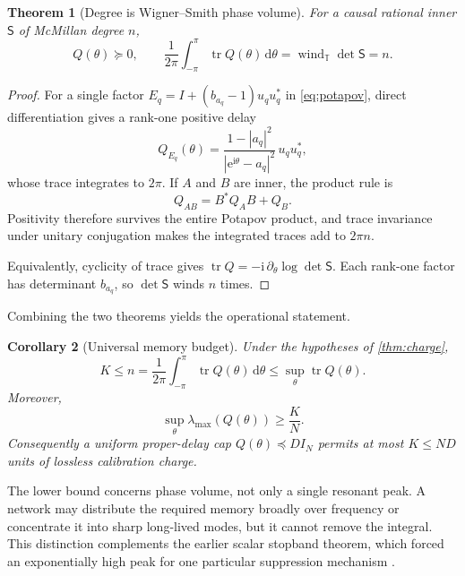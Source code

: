 \documentclass[11pt]{article}
\newtheorem{theorem}{Theorem}[section]
\newtheorem{corollary}[theorem]{Corollary}
\theoremstyle{definition}
\theoremstyle{remark}
\newcommand{\T}{\mathbb{T}}
\newcommand{\tr}{\operatorname{tr}}
\newcommand{\dd}{\mathrm{d}}
\newcommand{\e}{\mathrm{e}}
\begin{document}
\begin{theorem}[Degree is Wigner--Smith phase volume]
\label{thm:sumrule}
For a causal rational inner $\mathsf S$ of McMillan degree $n$,
\begin{equation}\label{eq:sumrule}
 Q(\theta)\succeq0,
 \qquad
 \frac1{2\pi}\int_{-\pi}^{\pi}\tr Q(\theta)\,\dd\theta
 =\operatorname{wind}_{\T}\det\mathsf S=n.
\end{equation}
\end{theorem}

\begin{proof}
For a single factor
$E_q=I+(b_{a_q}-1)u_qu_q^*$ in \eqref{eq:potapov}, direct differentiation
gives a rank-one positive delay
\begin{equation}\label{eq:poisson}
 Q_{E_q}(\theta)=
 \frac{1-|a_q|^2}{|\e^{\mathrm{i}\theta}-a_q|^2}\,u_qu_q^*,
\end{equation}
whose trace integrates to $2\pi$.  If $A$ and $B$ are inner, the product rule
is
\[
 Q_{AB}=B^*Q_AB+Q_B.
\]
Positivity therefore survives the entire Potapov product, and trace
invariance under unitary conjugation makes the integrated traces add to
$2\pi n$.

Equivalently, cyclicity of trace gives
$\tr Q=-\mathrm{i}\,\partial_\theta\log\det\mathsf S$.  Each rank-one
factor has determinant $b_{a_q}$, so $\det\mathsf S$ winds $n$ times.
\end{proof}

Combining the two theorems yields the operational statement.

\begin{corollary}[Universal memory budget]
\label{cor:memory}
Under the hypotheses of \cref{thm:charge},
\begin{equation}\label{eq:memorybudget}
 K\leq n
 =\frac1{2\pi}\int_{-\pi}^{\pi}\tr Q(\theta)\,\dd\theta
 \leq \sup_\theta\tr Q(\theta).
\end{equation}
Moreover,
\begin{equation}\label{eq:properdelay}
 \sup_\theta\lambda_{\max}(Q(\theta))\geq\frac{K}{N}.
\end{equation}
Consequently a uniform proper-delay cap $Q(\theta)\preceq D I_N$ permits at
most $K\leq ND$ units of lossless calibration charge.
\end{corollary}

The lower bound concerns phase volume, not only a single resonant peak.  A
network may distribute the required memory broadly over frequency or
concentrate it into sharp long-lived modes, but it cannot remove the integral.
This distinction complements the earlier scalar stopband theorem, which
forced an exponentially high peak for one particular suppression mechanism
\cite{ErikssonReservoir2026}.
\end{document}
